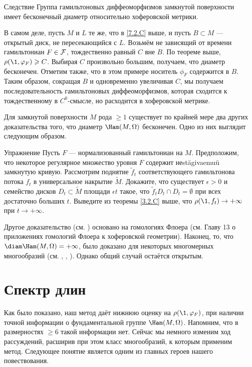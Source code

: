 \begin{thm}{Следствие}\label{7.2.D} Группа гамильтоновых диффеоморфизмов замкнутой поверхности имеет бесконечный диаметр относительно хоферовской метрики.
\end{thm}

В самом деле, пусть $M$ и $L$ те же, что в \ref{7.2.C} выше, и пусть $B \subset M$ --- открытый диск, не пересекающийся с $L$.
Возьмём не зависящий от времени гамильтониан $F \in \mathcal{F}$, тождественно равный $C$ вне $B$.
По теореме выше, $\rho (\1, \phi_F) \ge C$.
Выбирая $C$ произвольно большим, получаем, что диаметр бесконечен.
Отметим также, что в этом примере носитель $\phi_F$ содержится в $B$.
Таким образом, сокращая $B$ и одновременно увеличивая $C$, мы получаем
последовательность гамильтоновых диффеоморфизмов, которая сходится к
тождественному в $C^0$-смысле, но расходится в хоферовской метрике. 

Для замкнутой поверхности $M$ рода $\ge 1$ существует по крайней мере
два других доказательства того, что диаметр $\Ham (M, \Omega)$
бесконечен. 
Одно из них выглядит следующим образом. 

\begin{ex}[см. \cite{LM2}.]{Упражнение} \label{7.2.E}
Пусть $F$ --- нормализованный гамильтониан на $M$.
Предположим, что некоторое регулярное множество уровня $F$ содержит
неstägivaemuü замкнутую кривую. 
Рассмотрим поднятие $\tilde f_t$ соответствующего гамильтонова потока
$f_t$ в универсальное накрытие $\tilde M$. 
Докажите, что существует $\epsilon> 0$ и семейство дисков $D_t \subset
\tilde M$ площади $\epsilon t$ такое, что $\tilde f_t D_t \cap D_t =
\emptyset$ при всех достаточно больших $t$. 
Выведите из теоремы \ref{3.2.C} выше, что $\rho (\1, f_t) \to +
\infty$ при $t \to + \infty$. 
\end{ex}

Другое доказательство (см. \cite{Sch3}) основано на гомологиях Флоера (см. Главу 13 о приложениях гомологий Флоера к хоферовской геометрии).
Наконец, то, что $\diam \Ham (M, \Omega) = + \infty$, было доказано для некоторых многомерных многообразий (см. \cite{LM2}, \cite{Sch3}, \cite{P5}).
Однако общий случай остаётся открытым.

\section{Спектр длин}\label{sec:7.3}

Как было показано, наш метод даёт нижнюю оценку на $\rho (\1, \phi_F)$, при наличии точной информации о фундаментальной группе $\Ham (M, \Omega)$.
Напомним, что в размерностях $\ge 6$ такой информации нет.
Сейчас мы немного изменим ход рассуждений, расширив при этом класс многообразий, к которым применим метод.
Следующее понятие является одним из главных героев нашего повествования.

